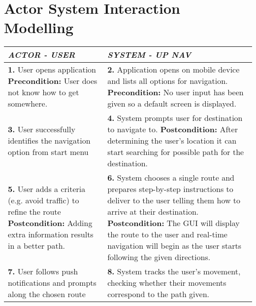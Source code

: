 \documentclass[a4paper,12pt]{article}
\begin{document}
	\newpage
	\section{Actor System Interaction Modelling}
		\begin{table}[!htbp]
			\footnotesize
			\label{tab:table 2.2}
			\bgroup
			\def\arraystretch{1.3}
			\begin{tabular}{|L|L|}
				\hline
			\textbf{\textit{ACTOR - USER}} & \textbf{\textit{SYSTEM - UP NAV}}
				\\
				\hline
				\textbf{1.} User opens application \linebreak \linebreak
				\textbf{Precondition:} User does not know how to get somewhere. & \textbf{2.} Application opens on mobile device and lists all options for navigation. \linebreak \linebreak
				\textbf{Precondition:} No user input has been given so a default screen is displayed.
				\\
				\hline
				\textbf{3.} User successfully identifies the navigation option from start menu \linebreak \linebreak
				 & \textbf{4.} System prompts user for destination to navigate to. \linebreak \linebreak
				 \textbf{Postcondition:} After determining the user's location it can start searching for possible path for the destination.
				\\
				\hline
				\textbf{5.} User adds a criteria (e.g. avoid traffic) to refine the route \linebreak \linebreak
				\textbf{Postcondition:} Adding extra information results in a better path.
				& \textbf{6.} System chooses a single route and prepares step-by-step instructions to deliver to the user telling them how to arrive at their destination. \linebreak \linebreak 
				\textbf{Postcondition:} The GUI will display the route to the user and real-time navigation will begin as the user starts following the given directions.
				\\
				\hline
				\textbf{7.} User follows push notifications and prompts along the chosen route \linebreak
				& \textbf{8.} System tracks the user's movement, checking whether their movements correspond to the path given. \linebreak

\end{tabular}
\end{table}
\end{document}
